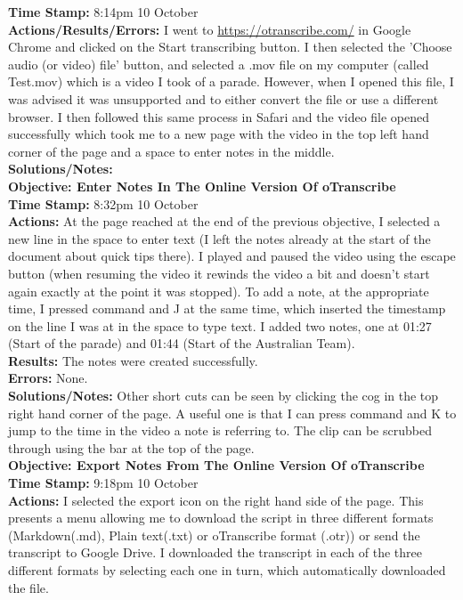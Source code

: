\documentclass{article}
\begin{document}
\begin{FlushLeft}
\textbf{Time Stamp:} 8:14pm 10 October\\
\textbf{Actions/Results/Errors:} I went to \url{https://otranscribe.com/} in Google Chrome and clicked on the Start transcribing button. I then selected the 'Choose audio (or video) file' button, and selected a .mov file on my computer (called Test.mov) which is a video I took of a parade. However, when I opened this file, I was advised it was unsupported and to either convert the file or use a different browser. I then followed this same process in Safari and the video file opened successfully which took me to a new page with the video in the top left hand corner of the page and a space to enter notes in the middle.\\
\textbf{Solutions/Notes:}\\
\vspace{5mm}
\textbf{Objective: Enter Notes In The Online Version Of oTranscribe}\\ 
\textbf{Time Stamp:} 8:32pm 10 October\\
\textbf{Actions:} At the page reached at the end of the previous objective, I selected a new line in the space to enter text (I left the notes already at the start of the document about quick tips there). I played and paused the video using the escape button (when resuming the video it rewinds the video a bit and doesn't start again exactly at the point it was stopped). To add a note, at the appropriate time, I pressed command and J at the same time, which inserted the timestamp on the line I was at in the space to type text. I added two notes, one at 01:27 (Start of the parade) and 01:44 (Start of the Australian Team). \\
\textbf{Results:} The notes were created successfully.\\
\textbf{Errors:} None.\\
\textbf{Solutions/Notes:} Other short cuts can be seen by clicking the cog in the top right hand corner of the page. A useful one is that I can press command and K to jump to the time in the video a note is referring to. The clip can be scrubbed through using the bar at the top of the page.\\
\vspace{5mm}
\textbf{Objective: Export Notes From The Online Version Of oTranscribe}\\ 
\textbf{Time Stamp:} 9:18pm 10 October\\
\textbf{Actions:} I selected the export icon on the right hand side of the page. This presents a menu allowing me to download the script in three different formats (Markdown(.md), Plain text(.txt) or oTranscribe format (.otr)) or send the transcript to Google Drive. I downloaded the transcript in each of the three different formats by selecting each one in turn, which automatically downloaded the file.\\

\end{FlushLeft}
\end{document}
